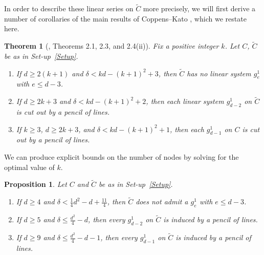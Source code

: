 \documentclass[fontsize=11pt,reqno]{amsart}
\newtheorem{theorem}[thm]{Theorem}
\newtheorem{proposition}[thm]{Proposition}
\theoremstyle{definition}
\theoremstyle{remark}
\newcommand{\tC}{\widetilde{C}}
\begin{document}
In order to describe these linear series on $\tC$ more precisely, we will first derive a number of corollaries of the main results of Coppens--Kato \cite{CK91, CK91correction}, which we restate here.

\begin{theorem}[\cite{CK91}, Theorems 2.1, 2.3, and 2.4(ii)]\label{thm:CKcompilation}
    Fix a positive integer $k$. Let $C$, $\tC$ be as in Set-up~\ref{Setup}.
    \begin{enumerate}[topsep=-1ex, itemsep=-0.5ex, partopsep=1ex, parsep=1ex]
        \item[(i)] If $d \geq 2(k+1)$ and $\delta < kd - (k+1)^2 + 3$, then $\tC$ has no linear system $g_{e}^1$ with $e \leq d-3$.
        \item[(ii)] If $d \geq 2k+3$ and $\delta < kd - (k+1)^{2}+2$, then each linear system $g_{d-2}^{1}$ on $\tC$ is cut out by a pencil of lines.
        \item[(iii)] If $k \geq 3$, $d \geq 2k+3$, and $\delta < kd - (k+1)^{2} + 1$, then each $g^{1}_{d-1}$ on $C$ is cut out by a pencil of lines.
    \end{enumerate}
\end{theorem}

We can produce explicit bounds on the number of nodes by solving for the optimal value of $k$.

\begin{proposition}\label{prop:corollaryOfCK}
    Let $C$ and $\tC$ be as in Set-up~\ref{Setup}.
    \begin{enumerate}[topsep=-1ex, itemsep=-0.5ex, partopsep=1ex, parsep=1ex]
        \item[(i)]\label{prop:corollaryOfCK-1} If $d \geq 4$ and $\delta < \frac{1}{4} d^{2} - d + \frac{11}{4}$, then $\tC$ does not admit a $g^{1}_{e}$ with $e \leq d-3$.
        \item[(ii)]\label{prop:corollaryOfCK-2} If $d \geq 5$ and $\delta \leq \frac{d^{2}}{4} - d$, then every $g^{1}_{d-2}$ on $\tC$ is induced by a pencil of lines.
        \item[(iii)]\label{prop:corollaryOfCK-3} If $d \geq 9$ and $\delta \leq \frac{d^{2}}{4} - d - 1$, then every $g^{1}_{d-1}$ on $\tC$ is induced by a pencil of lines.
    \end{enumerate}
\end{proposition}
\end{document}
